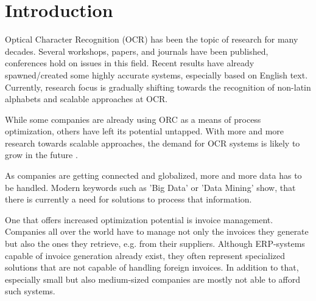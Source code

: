 %
% 

\chapter{Introduction}
\label{cha1}
Optical Character Recognition (OCR) has been the topic of research for many decades. 
Several workshops, papers, and journals have been published, conferences hold on issues in this field. %
Recent results have already spawned/created some highly accurate systems, especially based on English text. Currently, research focus is gradually shifting towards the recognition of non-latin alphabets and scalable approaches at OCR. %

While some companies are already using ORC as a means of process optimization, others have left its potential untapped. With more and more research towards scalable approaches, the demand for OCR systems is likely to grow in the future \cite{Klein04}\cite{Attaran01}\cite{Billentis16}.

As companies are getting connected and globalized, more and more data has to be handled. Modern keywords such as 'Big Data' or 'Data Mining' show, that there is currently a need for solutions to process that information.

One that offers increased optimization potential is invoice management. Companies all over the world have to manage not only the invoices they generate but also the ones they retrieve, e.g. from their suppliers.
Although ERP-systems capable of invoice generation already exist, they often represent specialized solutions that are not capable of handling foreign invoices. In addition to that, especially small but also medium-sized companies are mostly not able to afford such systems. 

